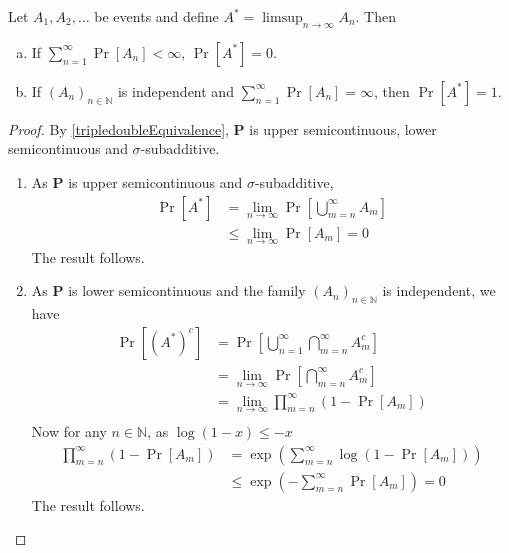 \begin{theorem}
\label{borelCantelliLemma}
    Let $A_1,A_2,\ldots$ be events and define $A^*=\limsup_{n\to\infty} A_n$. Then
    \begin{enumerate}[(a)]
        \item If $\sum_{n=1}^\infty \Pr[A_n]<\infty$, $\Pr[A^*]=0$.
        \item If $(A_n)_{n\in\mathbb{N}}$ is independent and $\sum_{n=1}^\infty \Pr[A_n]=\infty$, then $\Pr[A^*]=1$.
    \end{enumerate}
\end{theorem}
\begin{proof}
    By \ref{tripledoubleEquivalence}, $\textbf{P}$ is upper semicontinuous, lower semicontinuous and $\sigma$-subadditive.
    \begin{enumerate}
        \item As $\textbf{P}$ is upper semicontinuous and $\sigma$-subadditive,
        \begin{align*}
            \Pr[A^*] &= \lim_{n\to\infty}\Pr\left[\bigcup_{m=n}^\infty A_m\right] \\
            &\leq \lim_{n\to\infty} \Pr[A_m] = 0
        \end{align*}
        The result follows.
        
        \item As $\textbf{P}$ is lower semicontinuous and the family $(A_n)_{n\in\mathbb{N}}$ is independent, we have
        \begin{align*}
            \Pr[(A^*)^c] &= \Pr\left[\bigcup_{n=1}^\infty\bigcap_{m=n}^\infty A_m^c\right] \\
            &= \lim_{n\to\infty} \Pr\left[\bigcap_{m=n}^\infty A_m^c\right] \\
            &= \lim_{n\to\infty} \prod_{m=n}^\infty \left(1-\Pr[A_m]\right) \\
        \end{align*}
        Now for any $n\in\mathbb{N}$, as $\log(1-x)\leq -x$
        \begin{align*}
            \prod_{m=n}^\infty \left(1-\Pr[A_m]\right)&= \exp\left(\sum_{m=n}^\infty \log(1-\Pr[A_m])\right) \\
            &\leq \exp\left(-\sum_{m=n}^\infty \Pr[A_m]\right) = 0
        \end{align*}
        The result follows.
    \end{enumerate}
\end{proof}

